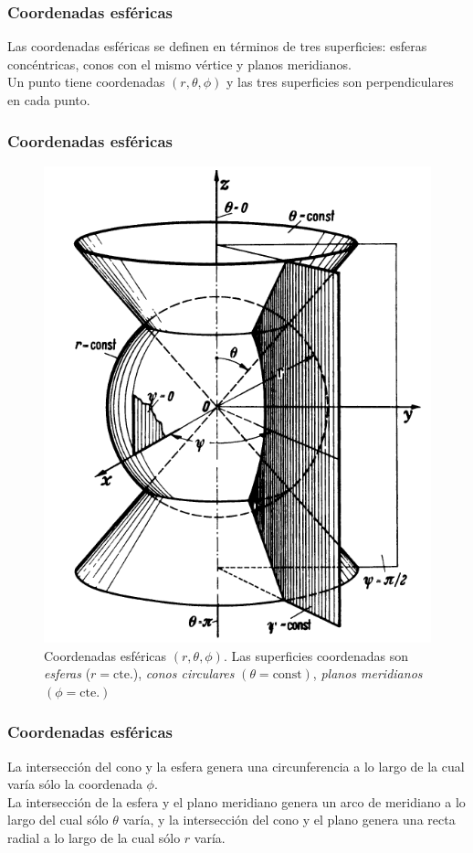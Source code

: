 \documentclass[12pt]{beamer}
\begin{document}
\begin{frame}
\frametitle{Coordenadas esféricas}
Las coordenadas esféricas se definen en términos de tres superficies: esferas concéntricas, conos con el mismo vértice y planos meridianos.
\\
\bigskip
\pause
Un punto tiene coordenadas $(r, \theta, \phi)$ y las tres superficies son perpendiculares en cada punto.
\end{frame}
\begin{frame}
\frametitle{Coordenadas esféricas}
\begin{figure}[h!]
   \centering
   \includegraphics{Imagenes/Planos_Coordenadas_Esfericas.png}
   \caption{Coordenadas esféricas $(r, \theta, \phi)$. Las superficies coordenadas son \emph{esferas} ($r = \mbox{cte.}$), \emph{conos circulares} $(\theta = \mbox{const})$, \emph{planos meridianos} $(\phi = \mbox{cte.})$}
   \label{fig:figura_planos_esfericos}
\end{figure}
\end{frame}
\begin{frame}
\frametitle{Coordenadas esféricas}
La intersección del cono y la esfera genera una circunferencia a lo largo de la cual varía
sólo la coordenada $\phi$.
\\
\bigskip
\pause
La intersección de la esfera y el plano meridiano genera un arco de meridiano a lo largo del cual sólo $\theta$ varía, y la intersección del cono y el plano genera una recta radial a lo largo de la cual sólo $r$ varía.
\end{frame}
\end{document}
